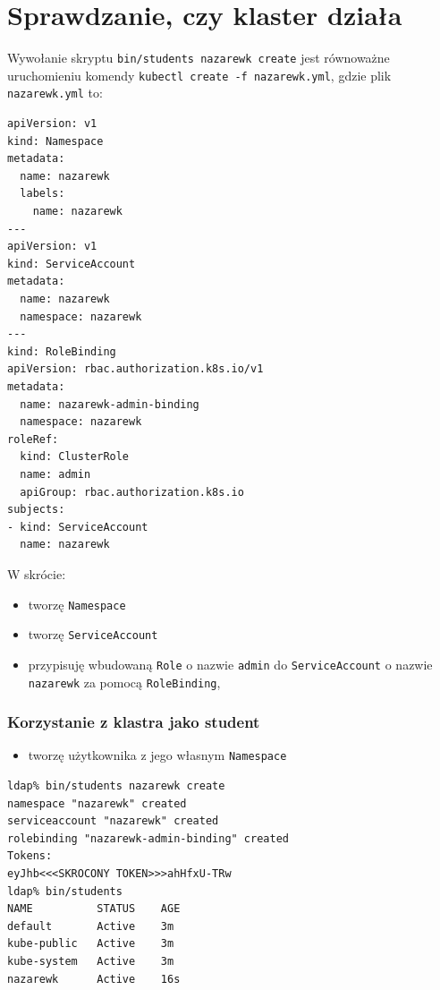 \documentclass[a4paper,12pt,twoside,openany]{report}
\providecommand{\tightlist}{%
  \setlength{\itemsep}{0pt}\setlength{\parskip}{0pt}}
\newcommand{\passthrough}[1]{#1}
\begin{document}
\hypertarget{sprawdzanie-czy-klaster-dziaux142a}{%
\section{Sprawdzanie, czy klaster
działa}\label{sprawdzanie-czy-klaster-dziaux142a}}

Wywołanie skryptu \passthrough{\lstinline!bin/students nazarewk create!}
jest równoważne uruchomieniu komendy
\passthrough{\lstinline!kubectl create -f nazarewk.yml!}, gdzie plik
\passthrough{\lstinline!nazarewk.yml!} to:

\begin{lstlisting}
apiVersion: v1
kind: Namespace
metadata:
  name: nazarewk
  labels:
    name: nazarewk
---
apiVersion: v1
kind: ServiceAccount
metadata:
  name: nazarewk
  namespace: nazarewk
---
kind: RoleBinding
apiVersion: rbac.authorization.k8s.io/v1
metadata:
  name: nazarewk-admin-binding
  namespace: nazarewk
roleRef:
  kind: ClusterRole
  name: admin
  apiGroup: rbac.authorization.k8s.io
subjects:
- kind: ServiceAccount
  name: nazarewk
\end{lstlisting}

W skrócie:

\begin{itemize}
\tightlist
\item
  tworzę \passthrough{\lstinline!Namespace!}
\item
  tworzę \passthrough{\lstinline!ServiceAccount!}
\item
  przypisuję wbudowaną \passthrough{\lstinline!Role!} o nazwie
  \passthrough{\lstinline!admin!} do
  \passthrough{\lstinline!ServiceAccount!} o nazwie
  \passthrough{\lstinline!nazarewk!} za pomocą
  \passthrough{\lstinline!RoleBinding!},
\end{itemize}

\hypertarget{korzystanie-z-klastra-jako-student}{%
\subsubsection{Korzystanie z klastra jako
student}\label{korzystanie-z-klastra-jako-student}}

\begin{itemize}
\tightlist
\item
  tworzę użytkownika z jego własnym \passthrough{\lstinline!Namespace!}
\end{itemize}

\begin{lstlisting}
ldap% bin/students nazarewk create
namespace "nazarewk" created
serviceaccount "nazarewk" created
rolebinding "nazarewk-admin-binding" created
Tokens:
eyJhb<<<SKROCONY TOKEN>>>ahHfxU-TRw
ldap% bin/students
NAME          STATUS    AGE
default       Active    3m
kube-public   Active    3m
kube-system   Active    3m
nazarewk      Active    16s
\end{lstlisting}
\end{document}
